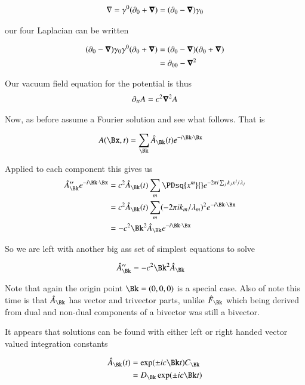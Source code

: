 \begin{align*}
\nabla = \gamma^0(\partial_0 + \boldsymbol{\nabla}) = (\partial_0 - \boldsymbol{\nabla}) \gamma_0
\end{align*}

our four Laplacian can be written

\begin{align*}
(\partial_0 - \boldsymbol{\nabla}) \gamma_0 \gamma^0(\partial_0 + \boldsymbol{\nabla}) 
&= (\partial_0 - \boldsymbol{\nabla}) (\partial_0 + \boldsymbol{\nabla}) \\
&= \partial_{00} - \boldsymbol{\nabla}^2
\end{align*}

Our vacuum field equation for the potential is thus
\begin{align}
\partial_{tt} A = c^2 \boldsymbol{\nabla}^2 A
\end{align}

Now, as before assume a Fourier solution and see what follows.  That is

\begin{align}\label{eqn:potential_fourier:assumedPotential}
A(\Bx, t) &= \sum_{\Bk} \hat{A}_{\Bk}(t) e^{ -i \Bk \cdot \Bx}
\end{align}

Applied to each component this gives us
\begin{align*}
\hat{A}_{\Bk}'' e^{ -i \Bk \cdot \Bx} 
&= c^2 \hat{A}_{\Bk}(t) \sum_m \PDsq{x^m}{} e^{ - 2 \pi i \sum_j k_j x^j /\lambda_j} \\
&= c^2 \hat{A}_{\Bk}(t) \sum_m (- 2 \pi i k_m/\lambda_m)^2 e^{ - i \Bk \cdot \Bx } \\
&= -c^2 \Bk^2 \hat{A}_{\Bk} e^{ - i \Bk \cdot \Bx }
\end{align*}

So we are left with another big ass set of simplest equations to solve

\begin{align*}
\hat{A}_{\Bk}'' &= -c^2 \Bk^2 \hat{A}_{\Bk}
\end{align*}

Note that again the origin point $\Bk = (0,0,0)$ is a special case.  Also of note this time is that $\hat{A}_{\Bk}$ has vector and trivector parts, unlike $\hat{F}_{\Bk}$ which being derived from dual and non-dual components of a bivector was still a bivector.

It appears that solutions can be found with either left or right handed
vector valued integration constants

\begin{align*}
\hat{A}_{\Bk}(t) &= \exp(\pm i c \Bk t) C_{\Bk} \\
                 &= D_{\Bk} \exp(\pm i c \Bk t)
\end{align*}

